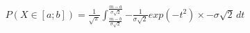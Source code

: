 \documentclass[preview]{standalone}
\begin{document}
\begin{align*}
P( X \in [a;b] ) = { \frac{1}{\sqrt{\pi}} } \int_{ \frac{m - b}{\sigma \sqrt{2}} }^{ \frac{m - a}{\sigma \sqrt{2}} } { { - \frac{1}{\sigma \sqrt{2}} } exp( -t^2 ) \times - \sigma \sqrt{2} } \, dt
\end{align*}
\end{document}
